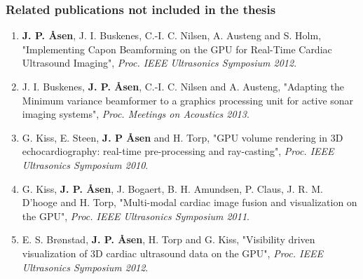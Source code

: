 \subsubsection{Related publications not included in the thesis}
\begin{enumerate}
	\item \textbf{J. P. \AA{}sen}, J. I. Buskenes, C.-I. C. Nilsen, A. Austeng and S. Holm, "Implementing Capon Beamforming on the GPU for Real-Time Cardiac Ultrasound Imaging", {\it Proc. IEEE Ultrasonics Symposium 2012}.

	\item J. I. Buskenes, \textbf{J. P. \AA{}sen}, C.-I. C. Nilsen and A. Austeng, "Adapting the Minimum variance beamformer to a graphics processing unit for active sonar imaging systems", {\it Proc. Meetings on Acoustics 2013}.
	
	\item G. Kiss, E. Steen, \textbf{J. P \AA{}sen} and H. Torp, "GPU volume rendering in 3D echocardiography: real-time pre-processing and ray-casting", {\it Proc. IEEE Ultrasonics Symposium 2010}.

	\item G. Kiss, \textbf{J. P. \AA{}sen}, J. Bogaert, B. H. Amundsen, P. Claus, J. R. M. D'hooge and H. Torp, "Multi-modal cardiac image fusion and visualization on the GPU", {\it Proc. IEEE Ultrasonics Symposium 2011}.

	\item E. S. Br\o{}nstad, \textbf{J. P. \AA{}sen}, H. Torp and G. Kiss, "Visibility driven visualization of 3D cardiac ultrasound data on the GPU", {\it Proc. IEEE Ultrasonics Symposium 2012}.
\end{enumerate}

\endinput